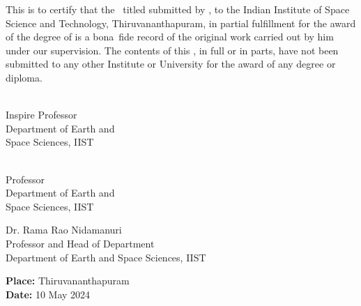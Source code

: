 \begin{ThesisCertificate}

\noindent This is to certify that the \Doctype\ titled \textbf{\textit{\Title}}
submitted by {\bf\Author}, to the Indian Institute of Space Science and
Technology, Thiruvananthapuram, in partial fulfillment for the award of the degree of {\bf\Degreetext} is a bona~fide record of the original work carried
out by him under our supervision. The contents of this \Doctype, in full or in parts, have not been submitted to any other Institute or University for the award of any degree or diploma.

\vspace{35mm}
\noindent
\begin{minipage}{0.5\textwidth}
\begin{flushleft}
\vspace*{-5mm}
\FirstAdvisor \\
Inspire Professor \\
Department of Earth and \\Space Sciences, IIST

\end{flushleft}
\end{minipage}
\hspace{2cm}
\begin{minipage}{0.5\textwidth}
\vspace{-5mm}
\begin{flushleft}
\SecondAdvisor \\
Professor \\
Department of Earth and \\Space Sciences, IIST
\end{flushleft}
\end{minipage}

\begin{center}
\vspace{35mm}
Dr. Rama Rao Nidamanuri\\
Professor and Head of Department \\
Department of Earth and Space Sciences, IIST
\end{center}


\vspace{21mm}
\noindent
\textbf{Place: }Thiruvananthapuram\\
\textbf{Date: }10 May 2024

\end{ThesisCertificate}
